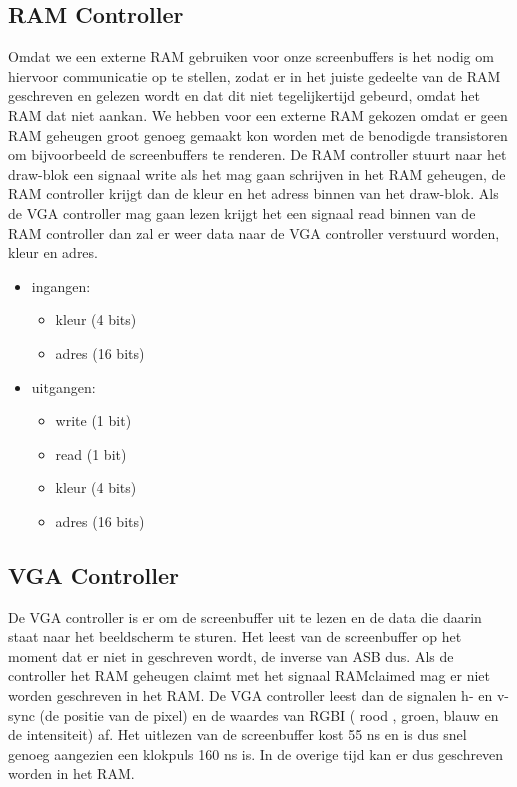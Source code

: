 \subsection{RAM Controller}
Omdat we een externe RAM gebruiken voor onze screenbuffers is het nodig om hiervoor communicatie op te stellen, zodat er in het juiste gedeelte van de RAM geschreven en gelezen wordt en dat dit niet tegelijkertijd gebeurd, omdat het RAM dat niet aankan. We hebben voor een externe RAM gekozen omdat er geen RAM geheugen groot genoeg gemaakt kon worden met de benodigde transistoren om bijvoorbeeld de screenbuffers te renderen. De RAM controller stuurt naar het draw-blok een signaal write als het mag gaan schrijven in het RAM geheugen, de RAM controller krijgt dan de kleur en het adress binnen van het draw-blok. Als de VGA controller mag gaan lezen krijgt het een signaal read binnen van de RAM controller dan zal er weer data naar de VGA controller verstuurd worden, kleur en adres.

\begin {itemize}
\item ingangen:
\begin {itemize}
\item kleur (4 bits)
\item adres (16 bits)
\end {itemize}
\item uitgangen:
\begin {itemize}
\item write (1 bit)
\item read (1 bit)
\item kleur (4 bits)
\item adres (16 bits)
\end {itemize}
\end {itemize}

\subsection{VGA Controller}
De VGA controller is er om de screenbuffer uit te lezen en de data die daarin staat naar het beeldscherm te sturen. Het leest van de screenbuffer op het moment dat er niet in geschreven wordt, de inverse van ASB dus. Als de controller het RAM geheugen claimt met het signaal RAMclaimed mag er niet worden geschreven in het RAM. De VGA controller leest dan de signalen h- en v-sync (de positie van de pixel) en de waardes van RGBI ( rood , groen, blauw en de intensiteit) af. Het uitlezen van de screenbuffer kost 55 ns en is dus snel genoeg aangezien een klokpuls 160 ns is. In de overige tijd kan er dus geschreven worden in het RAM.

